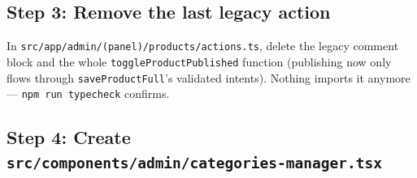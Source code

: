 \documentclass[11pt,a4paper]{article}
\begin{document}
\subsection*{Step 3: Remove the last legacy action}

In \texttt{src/app/admin/(panel)/products/actions.ts}, delete the legacy comment block and the whole
\texttt{toggleProductPublished} function (publishing now only flows through \texttt{saveProductFull}'s
validated intents). Nothing imports it anymore --- \texttt{npm run typecheck} confirms.

\subsection*{Step 4: Create \texttt{src/components/admin/categories-manager.tsx}}
\end{document}
